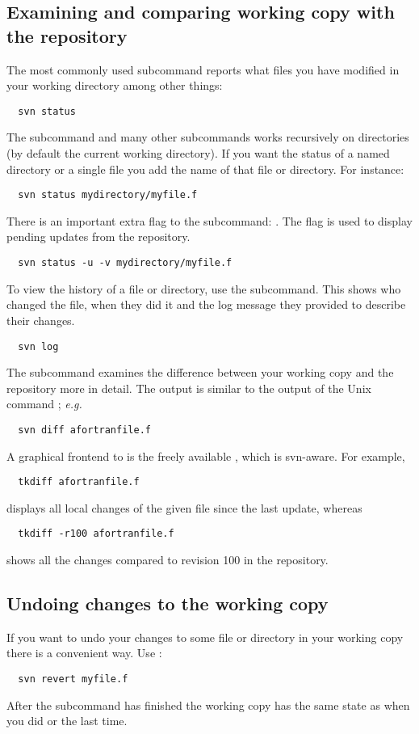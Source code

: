 \documentclass[10pt,a4paper]{simson}
\begin{document}
\subsection{Examining and comparing working copy with the repository}
The most commonly used subcommand reports what files you have modified
in your working directory among other things:
\begin{verbatim}
  svn status
\end{verbatim}
The  subcommand and many other subcommands works
recursively on directories (by default the current working
directory). If you want the status of a named directory or a single
file you add the name of that file or directory. For instance:
\begin{verbatim}
  svn status mydirectory/myfile.f
\end{verbatim}
There is an important extra flag to the  subcommand:
. The  flag is used to display pending
updates from the repository.
\begin{verbatim}
  svn status -u -v mydirectory/myfile.f
\end{verbatim}
To view the history of a file or directory, use the 
subcommand. This shows who changed the file, when they did it and the
log message they provided to describe their changes.
\begin{verbatim}
  svn log
\end{verbatim}
The  subcommand examines the difference between your
working copy and the repository more in detail. The output is similar
to the output of the Unix command ; \emph{e.g.}
\begin{verbatim}
  svn diff afortranfile.f
\end{verbatim}
A graphical frontend to  is the freely available , which is svn-aware. For example,
\begin{verbatim}
  tkdiff afortranfile.f
\end{verbatim}
displays all local changes of the given file since the last update, whereas
\begin{verbatim}
  tkdiff -r100 afortranfile.f
\end{verbatim}
shows all the changes compared to revision 100 in the repository.


\subsection{Undoing changes to the working copy}
If you want to undo your changes to some file or directory in your
working copy there is a convenient way. Use :
\begin{verbatim}
  svn revert myfile.f
\end{verbatim}
After the  subcommand has finished the working copy
has the same state as when you did  or
 the last time.
\end{document}
